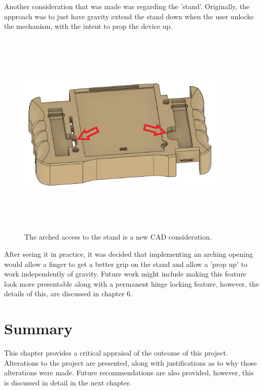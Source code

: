 Another consideration that was made was regarding the 'stand'.
Originally, the approach was to just have gravity extend the stand down when the user unlocks the mechanism, with the intent to prop the device up.

\begin{figure} [h]
    \centering
    \includegraphics[width=10cm,height=10cm,keepaspectratio]{Figures/stand_new.png}
    \caption{The arched access to the stand is a new CAD consideration.}
    \label{fig:NewStand}
\end{figure}

After seeing it in practice, it was decided that implementing an arching opening would allow a finger to get a better grip on the stand and allow a 'prop up' to work independently of gravity.
Future work might include making this feature look more presentable along with a permanent hinge locking feature, however, the details of this, are discussed in chapter 6.


\section{Summary}
This chapter provides a critical appraisal of the outcome of this project.
Alterations to the project are presented, along with justifications as to why those alterations were made.
Future recommendations are also provided, however, this is discussed in detail in the next chapter.